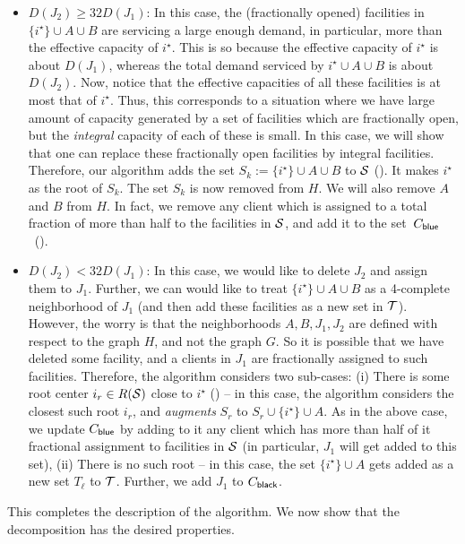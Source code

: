 \begin{itemize}
\item $D(J_2) \geq 32 D(J_1)$: In this case, the (fractionally opened) facilities in $\{i^\star\} \cup A \cup B$ are servicing a large enough demand, in particular, more than the effective capacity of $i^\star$. This is so because
    the effective capacity of $i^\star$ is about $D(J_1)$, whereas the total demand serviced by $i^\star \cup A \cup B$ is about $D(J_2)$. Now, notice that the effective capacities of all these facilities is at most that of $i^\star$. Thus,
    this corresponds to a situation where we have large amount of capacity generated by a set of facilities which are fractionally open, but the {\em integral} capacity of each of these is small. In this case, we will show that one can replace these fractionally open facilities by integral facilities. Therefore, our algorithm adds the set
    $ S_k := \{i^\star\} \cup A \cup B$ to ${\cal S}$ (). It makes $i^\star$ as the root of  $S_k$. The set
    $S_k$ is now removed from $H$. We will also remove $A$ and $B$ from $H$. In fact, we remove any client which is assigned to a total fraction of more than half to the facilities in ${\cal S}$, and add it to the set~$C_{\mathsf{blue}}$~().
\item $D(J_2) < 32 D(J_1)$: In this case, we would like to delete $J_2$ and assign them to $J_1$. Further, we can would like to treat $\{i^\star\} \cup A \cup B$ as a 4-complete neighborhood of $J_1$ (and then add these facilities as a new set in ${\cal T}$). However, the worry is that the neighborhoods $A,B, J_1, J_2$ are defined with respect to the graph
    $H$, and not the graph $G$. So it is possible that we have deleted some facility, and a clients in $J_1$ are fractionally assigned to such facilities. Therefore, the algorithm considers two sub-cases: (i) There is some root center  $i_r \in R({\cal S})$ close to $i^\star$ () -- in this
    case, the algorithm considers the closest such root $i_r$, and {\em augments} $S_r$ to $S_r \cup \{i^\star\} \cup A$. As in the above case,
    we update $C_{\mathsf{blue}}$ by adding to it any client which has more than half of it fractional assignment to facilities in ${\cal S}$ (in particular, $J_1$ will
    get added to this set), (ii) There is no such root -- in this case, the set $\{i^\star\} \cup A$ gets added as a new set $T_\ell$ to ${\cal T}$. Further,
    we add $J_1$ to $C_{\mathsf{black}}$.
    \end{itemize}

This completes the description of the algorithm. We now show that the decomposition has the desired properties.

